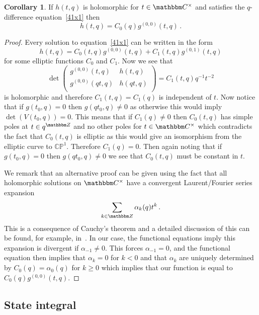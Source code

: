 \documentclass[12pt,reqno]{amsart}
\theoremstyle{definition}
\newtheorem{corollary}[theorem]{Corollary}
\def\BZ{\mathbbm Z}
\def\BC{\mathbbm C}
\def\be{\begin{equation}}
\def\ee{\end{equation}}
\begin{document}
\begin{corollary}
  \label{cor:41holsol}
  If $h(t,q)$ is holomorphic for $t\in\BC^{\times}$
  and satisfies the $q$-difference equation~\eqref{41x1} then
\be
h(t,q)=C_{0}(q)g^{(0,0)}(t,q) \,.
\ee
\end{corollary}

\begin{proof}
Every solution to equation~\eqref{41x1} can be written in the form
\be
h(t,q)=C_{0}(t,q)g^{(0,0)}(t,q)+C_{1}(t,q)g^{(0,1)}(t,q)
\ee
for some elliptic functions $C_0$ and $C_1$. Now we see that
\be
\det
\begin{pmatrix}
g^{(0,0)}(t,q) & h(t,q)\\
g^{(0,0)}(qt,q) & h(qt,q)\\
\end{pmatrix}
=
C_{1}(t,q)q^{-1}t^{-2}
\ee
is holomorphic and therefore $C_{1}(t,q)=C_{1}(q)$ is independent of $t$. Now
notice that if $g(t_{0},q)=0$ then $g(qt_{0},q)\neq0$ as otherwise this would imply
$\det(V(t_{0},q))=0$. This means that if $C_{1}(q)\neq0$ then $C_{0}(t,q)$ has
simple poles at $t\in q^{\BZ}$ and no other poles for $t\in\BC^{\times}$ which
contradicts the fact that $C_{0}(t,q)$ is elliptic as this would give an isomorphism
from the elliptic curve to $\mathbb{CP}^{1}$. Therefore
$C_{1}(q)=0$. Then again noting that if $g(t_{0},q)=0$ then $g(qt_{0},q)\neq0$
we see that $C_{0}(t,q)$ must be constant in $t$.

We remark that an alternative proof can be given using the fact that all holomorphic
solutions on $\BC^{\times}$ have a convergent Laurent/Fourier series expansion
\be
\sum_{k\in\BZ}\alpha_{k}(q)t^{k} \,.
\ee
This is a consequence of Cauchy's theorem and a detailed discussion of this
can be found, for example, in~\cite{Ahlfors}. In our case, the functional equations
imply this expansion is divergent if $\alpha_{-1}\neq0$. This forces
$\alpha_{-1}=0$, and the functional equation then implies that $\alpha_{k}=0$
  for $k<0$ and that $\alpha_{k}$ are
uniquely determined by $C_{0}(q)=\alpha_{0}(q)$ for $k \geq 0$ which implies
that our function is equal to $C_{0}(q)g^{(0,0)}(t,q)$.
\end{proof}

\subsection{State integral}
\label{sub.state}
\end{document}
